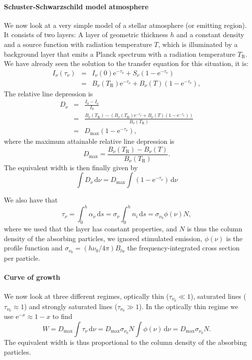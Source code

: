 \documentclass[12pt]{article}
\numberwithin{equation}{section}
\def\exp{\mathrm{e}}
\def\dd{\mathrm{d}}
\def\Inu{\ensuremath{I_{\nu}}}
\def\Bnu{\ensuremath{B_{\nu}}}
\def\Snu{\ensuremath{S_{\nu}}}
\def\anu{\ensuremath{\alpha_{\nu}}}
\def\taunu{\ensuremath{\tau_{\nu}}}
\def\ds{\ensuremath{\dd s}}
\def\dnu{\ensuremath{\dd \nu}}
\newcommand{\be}{\begin{equation}}
\newcommand{\ee}{\end{equation}}
\newcommand{\bea}{\begin{eqnarray}}
\newcommand{\eea}{\end{eqnarray}}
\begin{document}
 \paragraph{Schuster-Schwarzschild model atmosphere}
 We now look at a very simple model of a stellar atmosphere (or emitting region). It consists of two layers: A layer of geometric thickness $h$ and a constant  density and a source function with radiation temperature $T$, which is illuminated by a background layer that emits a Planck spectrum with a radiation temperature $T_\mathrm{R}$. We have already seen the solution to the transfer equation for this situation, it is:
 \bea
 \Inu(\taunu) & =& \Inu(0)  \exp^{-\taunu}  +  \Snu (1-\exp^{-\taunu}) \nonumber \\
   &= &\Bnu(T_\mathrm{R})  \exp^{-\taunu}  +  \Bnu(T) (1-\exp^{-\taunu}),
 \eea
 The relative line depression is
 \bea
 D_\nu &=& \frac{I_0 - \Inu}{I_0} \nonumber \\
 &=& \frac{\Bnu(T_\mathrm{R}) - \left( \Bnu(T_\mathrm{R})  \exp^{-\taunu}  +  \Bnu(T) (1-\exp^{-\taunu}) \right) }{\Bnu(T_\mathrm{R})} \nonumber \\
  &=& D_\mathrm{max} (1-\exp^{-\taunu}),
 \eea
 where the maximum attainable relative line depression is
 \be
 D_\mathrm{max} = \frac{\Bnu(T_\mathrm{R}) -\Bnu(T)}{\Bnu(T_\mathrm{R})}.
 \ee
 The equivalent width is then finally given by
 \be
 \int D_\nu \, \dnu = D_\mathrm{max} \int (1-\exp^{-\taunu}) \, \dnu
 \ee
 
We also have that
\be
\taunu =  \int_0^h \anu \,  \ds = \sigma_\nu \int_0^h n_i  \, \ds = \sigma_{\nu_0} \phi(\nu) N,
\ee
where we used that the layer has constant properties, and $N$ is thus the column density of the absorbing particles, we ignored stimulated emission, $\phi(\nu)$ is the profile function and $\sigma_{\nu_0} = (h \nu_0/4 \pi) B_{lu} $ the frequency-integrated cross section per particle.

\paragraph{Curve of growth}

We now look at three different regimes, optically thin ($\tau_{\nu_0} \ll 1$), saturated lines ($\tau_{\nu_0} \approx 1$) and strongly saturated lines  ($\tau_{\nu_0} \gg 1$). In the optically thin regime we use $\exp^{-x} \approx 1-x$ to find
\be
W= D_\mathrm{max} \int \taunu \, \dnu = D_\mathrm{max} \sigma_{\nu_0} N \int  \phi(\nu) \, \dnu =D_\mathrm{max} \sigma_{\nu_0} N.
\ee
The equivalent width is thus proportional to the column density of the absorbing particles. 
\end{document}
